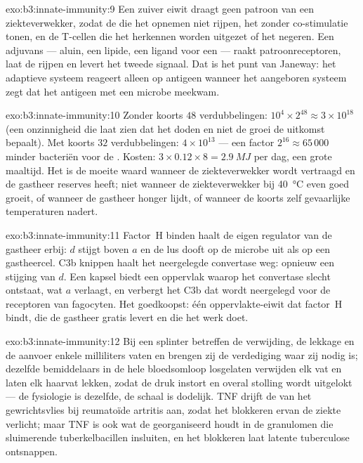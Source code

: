 \begin{solution}{exo:b3:innate-immunity:9}
Een zuiver eiwit draagt geen patroon van een ziekteverwekker, zodat de
 die het opnemen niet rijpen, het zonder
co-stimulatie tonen, en de T-cellen die het herkennen worden uitgezet
of het negeren. Een adjuvans --- aluin, een lipide, een ligand voor een
 --- raakt patroonreceptoren, laat de
 rijpen en levert het tweede signaal. Dat is het punt
van Janeway: het adaptieve systeem reageert alleen op antigeen wanneer
het aangeboren systeem zegt dat het antigeen met een microbe meekwam.
\end{solution}

\begin{solution}{exo:b3:innate-immunity:10}
Zonder koorts $48$ verdubbelingen: $10^{4}\times 2^{48} \approx 3\times
10^{18}$ (een onzinnigheid die laat zien dat het doden en niet de groei
de uitkomst bepaalt). Met koorts $32$ verdubbelingen: $4\times 10^{13}$
--- een factor $2^{16} \approx 65\,000$ minder bacteriën voor de
. Kosten: $3\times 0.12\times 8 = \qty{2.9}{MJ}$ per dag,
een grote maaltijd. Het is de moeite waard wanneer de ziekteverwekker
wordt vertraagd en de gastheer reserves heeft; niet wanneer de
ziekteverwekker bij \qty{40}{\celsius} even goed groeit, of wanneer de
gastheer honger lijdt, of wanneer de koorts zelf gevaarlijke
temperaturen nadert.
\end{solution}

\begin{solution}{exo:b3:innate-immunity:11}
Factor~H binden haalt de eigen regulator van de gastheer erbij: $d$
stijgt boven $a$ en de lus dooft op de microbe uit als op een
gastheercel. C3b knippen haalt het neergelegde convertase weg: opnieuw
een stijging van $d$. Een kapsel biedt een oppervlak waarop het
convertase slecht ontstaat, wat $a$ verlaagt, en verbergt het C3b dat
wordt neergelegd voor de receptoren van fagocyten. Het goedkoopst: één
oppervlakte-eiwit dat factor~H bindt, die de gastheer gratis levert en
die het werk doet.
\end{solution}

\begin{solution}{exo:b3:innate-immunity:12}
Bij een splinter betreffen de verwijding, de lekkage en de aanvoer
enkele milliliters vaten en brengen zij de verdediging waar zij nodig
is; dezelfde bemiddelaars in de hele bloedsomloop losgelaten verwijden
elk vat en laten elk haarvat lekken, zodat de druk instort en overal
stolling wordt uitgelokt --- de fysiologie is dezelfde, de schaal is
dodelijk. TNF drijft de  van het gewrichtsvlies bij
reumatoïde artritis aan, zodat het blokkeren ervan de ziekte verlicht;
maar TNF is ook wat de  georganiseerd houdt in de granulomen
die sluimerende tuberkelbacillen insluiten, en het blokkeren laat
latente tuberculose ontsnappen.
\end{solution}

